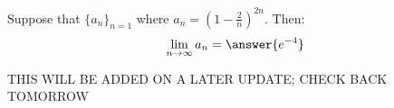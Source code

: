 \documentclass{ximera}
\author{Jim Talamo}
\begin{document}
\begin{exercise}


Suppose that $\{a_n \}_{n=1}$ where $a_n = \left(1-\frac{2}{n}\right)^{2n}$.  Then:
\[
\lim_{n \to \infty} a_n = \answer{e^{-4}}
\]

\begin{hint}
THIS WILL BE ADDED ON A LATER UPDATE; CHECK BACK TOMORROW
\end{hint}
\end{exercise}
\end{document}
